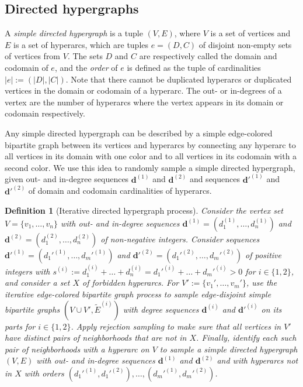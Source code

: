 \documentclass{article}
\theoremstyle{plain}
\theoremstyle{remark}
\theoremstyle{plain}
\newtheorem{definition}[theorem]{Definition}
\numberwithin{equation}{section}
\renewcommand{\d}{{\boldsymbol{d}}}
\begin{document}
	\subsection{Directed hypergraphs}\label{subsection_results_dihy}
	
	A \emph{simple directed hypergraph} is a tuple $(V,E)$, where $V$ is a set of vertices and $E$ is a set of hyperarcs, which are tuples $e=(D,C)$ of disjoint non-empty sets of vertices from $V$. The sets $D$ and $C$ are respectively called the domain and codomain of $e$, and the \emph{order} of $e$ is defined as the tuple of cardinalities $|e|:=(|D|,|C|)$. Note that there cannot be duplicated hyperarcs or duplicated vertices in the domain or codomain of a hyperarc. The out- or in-degrees of a vertex are the number of hyperarcs where the vertex appears in its domain or codomain respectively.
	
	Any simple directed hypergraph can be described by a simple edge-colored bipartite graph between its vertices and hyperarcs by connecting any hyperarc to all vertices in its domain with one color and to all vertices in its codomain with a second color. We use this idea to randomly sample a simple directed hypergraph, given out- and in-degree sequences $\d^{(1)}$ and $\d^{(2)}$ and sequences $\d'^{(1)}$ and $\d'^{(2)}$ of domain and codomain cardinalities of hyperarcs.
	
	\begin{definition}[Iterative directed hypergraph process]
		Consider the vertex set $V=\{v_1,\ldots,v_n\}$ with out- and in-degree sequences $\d^{(1)}=(d_1^{(1)},\ldots,d_n^{(1)})$ and $\d^{(2)}=(d_1^{(2)},\ldots,d_n^{(2)})$ of non-negative integers. Consider sequences $\d'^{(1)}=(d_1'^{(1)},\ldots,d_m'^{(1)})$ and $\d'^{(2)}=(d_1'^{(2)},\ldots,d_m'^{(2)})$ of positive integers with $s^{(i)}:=d_1^{(i)}+\ldots+d_n^{(i)}=d_1'^{(i)}+\ldots+d_m'^{(i)}>0$ for $i\in\{1,2\}$, and consider a set $X$ of forbidden hyperarcs. For $V':=\{v_1',\ldots,v_m'\}$, use the iterative edge-colored bipartite graph process to sample edge-disjoint simple bipartite graphs $(V\cup V',\widetilde{E}^{(i)})$ with degree sequences $\d^{(i)}$ and $\d'^{(i)}$ on its parts for $i\in\{1,2\}$. Apply rejection sampling to make sure that all vertices in $V'$ have distinct pairs of neighborhoods that are not in $X$. Finally, identify each such pair of neighborhoods with a hyperarc on $V$ to sample a simple directed hypergraph $(V,E)$ with out- and in-degree sequences $\d^{(1)}$ and $\d^{(2)}$ and with hyperarcs not in $X$ with orders $(d_1'^{(1)},d_1'^{(2)}),\ldots,(d_m'^{(1)},d_m'^{(2)})$.
	\end{definition}
	
\end{document}
